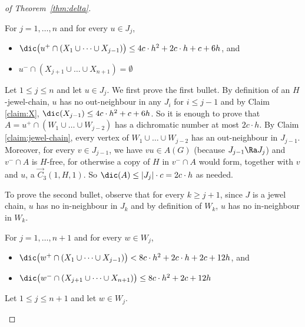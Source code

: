 \begin{proof}[of Theorem~\ref{thm:delta}]
\begin{claim}\label{clm:bounded_dichromatic_neighbours_J}
For $j=1, \dots, n$ and for every $u \in J_j$, 
\begin{itemize}
    \item $ \dic \big(u^+ \cap (X_1 \cup \dots \cup X_{j-1}) \big) \leq 4c \cdot h^2+  2c \cdot h + c + 6h $, and
    \item $ u^- \cap (X_{j+1} \cup \dots \cup X_{n+1}) = \emptyset $
\end{itemize}
\end{claim}

\begin{subproof} 
Let $1 \leq j \leq n$ and let $u \in J_j$. 
We first prove the first  bullet.  
By definition of an $H$-jewel-chain, $u$ has no out-neighbour in any $J_i$ for $i \leq j-1$ and by Claim \ref{claim:X}, $\dic(X_{j-1}) \leq  4c \cdot  h^2+c+ 6h$. 
So it is enough to prove that $A =  u^+ \cap (W_1 \cup \dots \cup W_{j-2})$ has a dichromatic number at most $2c \cdot h$. 
By Claim \ref{claim:jewel-chain}, every vertex of $W_1 \cup \dots \cup W_{j-2}$ has an out-neighbour in $J_{j-1}$.  
Moreover, for every $v \in J_{j-1}$, we have $vu \in A(G)$ (because $J_{j-1} \Ra J_j$)  and $v^- \cap A$ is $H$-free, for otherwise a copy of $H$ in $v^- \cap A$ would form, together with $v$ and $u$, a $\vec C_{3}(1, H, 1)$. So $\dic(A) \leq |J_j|\cdot c = 2c \cdot h$ as needed. 

To prove the second bullet, observe that for every $k \geq j+1$, since $J$ is a jewel chain, $u$ has no in-neighbour in $J_k$ and by definition of $W_k$, $u$ has no in-neighbour in $W_k$. 
\end{subproof}

\begin{claim}\label{clm:bounded_dichromatic_neighbours_W}
For $j=1, \dots, n +1$ and for every $w \in W_j$, 
\begin{itemize}
    \item $ \dic\big(w^+ \cap (X_1 \cup \dots \cup 
X_{j-1}) \big) < 8c \cdot h^2+  2c \cdot h + 2c + 12h $, and
\item $ \dic\big(w^- \cap (X_{j+1} \cup \dots \cup X_{n+1}) \big) \leq 8c \cdot h^2 + 2c + 12h$
\end{itemize}
\end{claim}

\begin{subproof}
Let $1 \leq j \leq n+1$ and let $w \in W_j$. 


\end{subproof}
\end{proof}
